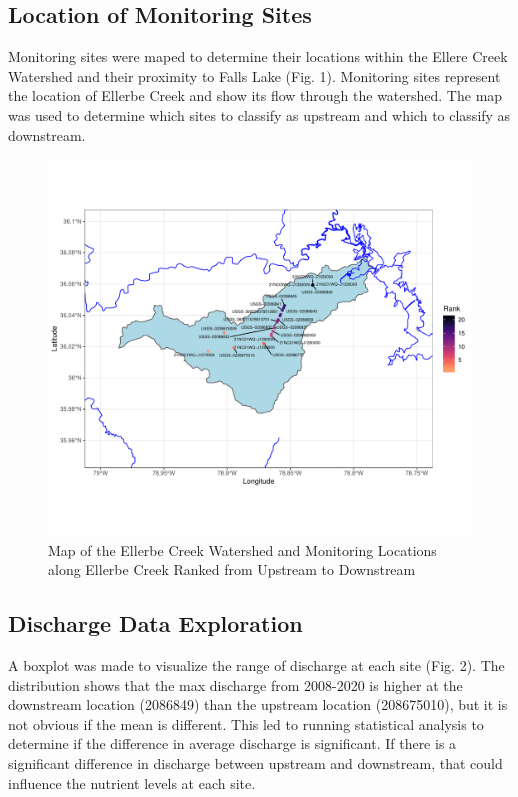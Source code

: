 \documentclass[12pt,]{article}
\begin{document}
\hypertarget{location-of-monitoring-sites}{%
\subsection{Location of Monitoring
Sites}\label{location-of-monitoring-sites}}

Monitoring sites were maped to determine their locations within the
Ellere Creek Watershed and their proximity to Falls Lake (Fig. 1).
Monitoring sites represent the location of Ellerbe Creek and show its
flow through the watershed. The map was used to determine which sites to
classify as upstream and which to classify as downstream.

\begin{figure}
\centering
\includegraphics{Landman_ENV872_Project_files/figure-latex/Exploratory Analysis Figure 1-1.pdf}
\caption{Map of the Ellerbe Creek Watershed and Monitoring Locations
along Ellerbe Creek Ranked from Upstream to Downstream}
\end{figure}

\newpage

\hypertarget{discharge-data-exploration}{%
\subsection{Discharge Data
Exploration}\label{discharge-data-exploration}}

A boxplot was made to visualize the range of discharge at each site
(Fig. 2). The distribution shows that the max discharge from 2008-2020
is higher at the downstream location (2086849) than the upstream
location (208675010), but it is not obvious if the mean is different.
This led to running statistical analysis to determine if the difference
in average discharge is significant. If there is a significant
difference in discharge between upstream and downstream, that could
influence the nutrient levels at each site.
\end{document}
